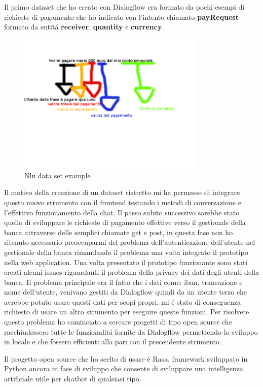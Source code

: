 Il primo dataset che ho creato con Dialogflow era formato da pochi esempi di richieste di pagamento che ho indicato con l'intento chiamato \textbf{payRequest} formato da entit\'a \textbf{receiver}, \textbf{quantity} e \textbf{currency}.
\begin{figure}[H]
 \centering
  \includegraphics[width=0.8\textwidth]{img/nludatasetexample.png}
 \caption{Nlu data set example}
\end{figure}
Il motivo della creazione di un dataset ristretto mi ha permesso di integrare questo nuovo strumento con il frontend testando i metodi di conversazione e l'effettivo funzionamento della chat.
Il passo subito successivo sarebbe stato quello di sviluppare le richieste di pagamento effettive verso il gestionale della banca attraverso delle semplici chiamate get e post, in questa fase non ho ritenuto necessario preoccuparmi del problema dell'autenticazione dell'utente nel gestionale della banca rimandando il problema una volta integrato il prototipo nella web application.
Una volta presentato il prototipo funzionante sono stati creati alcuni issues riguardanti il problema della privacy dei dati degli utenti della banca. 
Il problema principale era il fatto che i dati come: iban, transazione e nome dell'utente, venivano gestiti da Dialogflow quindi da un utente terzo che avrebbe potuto usare questi dati per scopi propri, mi \'e stato di conseguenza richiesto di usare un altro strumento per eseguire queste funzioni.
Per risolvere questo problema ho cominciato a cercare progetti di tipo open source che racchiudessero tutte le funzionalit\'a fornite da Dialogflow permettendo lo sviluppo in locale e che fossero efficienti alla pari con il precendente strumento.

Il progetto open source che ho scelto di usare \'e Rasa, framework sviluppato in Python ancora in fase di sviluppo che consente di sviluppare una intelligenza artificiale utile per chatbot di qualsiasi tipo.
